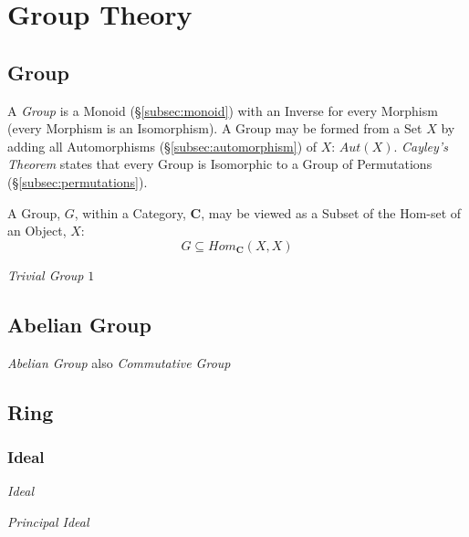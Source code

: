 \section{Group Theory}

\subsection{Group}\label{subsec:group}

A \emph{Group} is a Monoid (\S\ref{subsec:monoid}) with an Inverse for
every Morphism (every Morphism is an Isomorphism). A Group may be
formed from a Set $X$ by adding all Automorphisms
(\S\ref{subsec:automorphism}) of $X$: $Aut(X)$. \emph{Cayley's
  Theorem} states that every Group is Isomorphic to a Group of
Permutations (\S\ref{subsec:permutations}).

A Group, $G$, within a Category, $\mathbf{C}$, may be viewed as a
Subset of the Hom-set of an Object, $X$:
\[
    G \subseteq Hom_{\mathbf{C}}(X,X)
\]

\emph{Trivial Group} ${1}$



\subsection{Abelian Group}\label{subsec:abelian_group}

\emph{Abelian Group} also \emph{Commutative Group}



\subsection{Ring}\label{subsec:ring}

\subsubsection{Ideal}\label{subsec:ring_ideal}

\emph{Ideal}

\emph{Principal Ideal}



